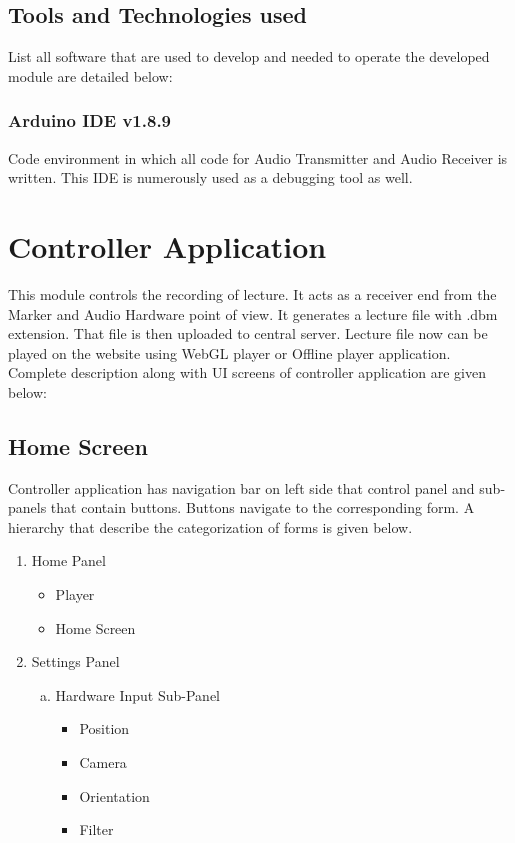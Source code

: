 \subsection{Tools and Technologies used}
List all software that are used to develop and needed to operate the developed module are detailed below:

\subsubsection{Arduino IDE v1.8.9}
Code environment in which all code for Audio Transmitter and Audio Receiver is written. This IDE is numerously used as a debugging tool as well. 

\section{Controller Application}
This module controls the recording of lecture. It acts as a receiver end from the Marker and Audio Hardware point of view. It generates a lecture file with .dbm extension. That file is then uploaded to central server. Lecture file now can be played on the website using WebGL player or Offline player application.\\

Complete description along with UI screens of controller application are given below:

\subsection{Home Screen}
Controller application has navigation bar on left side that control panel and sub-panels that contain buttons. Buttons navigate to the corresponding form. A hierarchy that describe the categorization of forms is given below.

\begin{enumerate}

\item Home Panel
\begin{itemize}
\item Player
\item Home Screen
\end{itemize}

\item Settings Panel
\begin{enumerate}[a.]

\item Hardware Input Sub-Panel
\begin{itemize}

\item Position
\item Camera
\item Orientation
\item Filter

\end{itemize}

\end{enumerate}

\end{enumerate}


